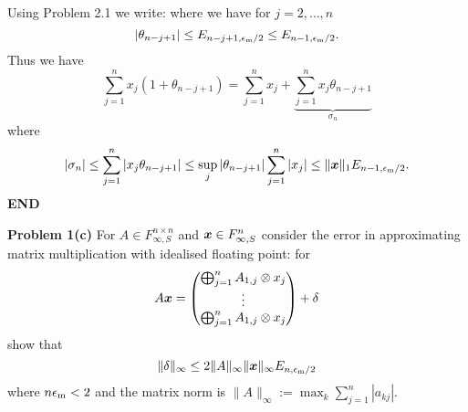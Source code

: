 \documentclass[12pt,a4paper]{article}
\def\x{ {\vc x} }
\begin{document}
Using Problem 2.1 we write:
where we have for $j = 2,\ensuremath{\ldots},n$
\[
|\ensuremath{\theta}_{n-j+1}| \ensuremath{\leq} E_{n-j+1,\ensuremath{\epsilon}_{\rm m}/2} \ensuremath{\leq} E_{n-1,\ensuremath{\epsilon}_{\rm m}/2}.
\]
Thus we have 
\[
\ensuremath{\sum}_{j=1}^n x_j (1 + \ensuremath{\theta}_{n-j+1})= \ensuremath{\sum}_{j=1}^n x_j + \underbrace{\ensuremath{\sum}_{j=1}^n x_j \ensuremath{\theta}_{n-j+1}}_{\ensuremath{\sigma}_n}
\]
where
\[
|\ensuremath{\sigma}_n| \ensuremath{\leq}  \ensuremath{\sum}_{j=1}^n |x_j \ensuremath{\theta}_{n-j+1}| \ensuremath{\leq} \sup_j |\ensuremath{\theta}_{n-j+1}| \ensuremath{\sum}_{j=1}^n |x_j|  \ensuremath{\leq} \| \ensuremath{\bm{\x}}\|_1 E_{n-1,\ensuremath{\epsilon}_{\rm m}/2}.
\]
\textbf{END}

\textbf{Problem 1(c)} For $A \ensuremath{\in} F_{\ensuremath{\infty},S}^{n \ensuremath{\times} n}$ and $\ensuremath{\bm{\x}} \ensuremath{\in} F_{\ensuremath{\infty},S}^n$ consider the error in approximating matrix multiplication with idealised floating point: for
\[
A \ensuremath{\bm{\x}} =  \begin{pmatrix}
\ensuremath{\bigoplus}_{j=1}^n A_{1,j} \ensuremath{\otimes} x_j\\
\ensuremath{\vdots} \\
\ensuremath{\bigoplus}_{j=1}^n A_{1,j} \ensuremath{\otimes} x_j
\end{pmatrix} + \ensuremath{\delta}
\]
show that
\[
\| \ensuremath{\delta} \|_\ensuremath{\infty} \ensuremath{\leq} 2 \|A\|_\ensuremath{\infty} \| \ensuremath{\bm{\x}} \|_\ensuremath{\infty} E_{n,\ensuremath{\epsilon}_{\rm m}/2}
\]
where  $n \ensuremath{\epsilon}_{\rm m} < 2$ and the matrix norm is $\|A \|_\ensuremath{\infty} := \max_k \ensuremath{\sum}_{j=1}^n |a_{kj}|$.
\end{document}
